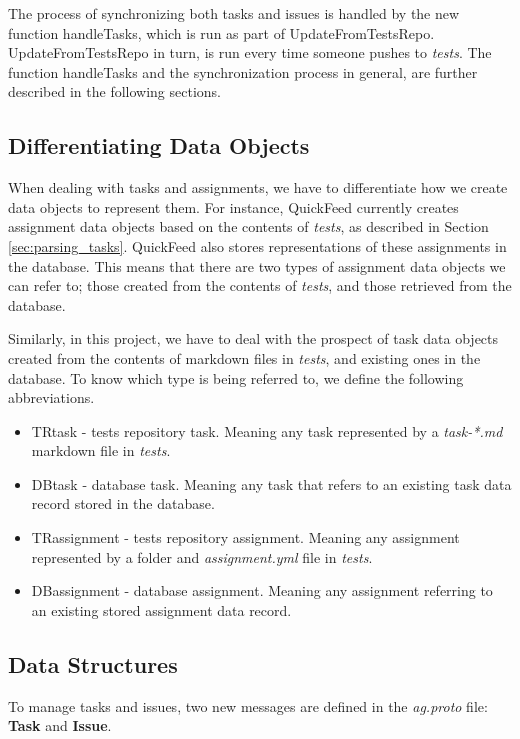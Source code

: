 The process of synchronizing both tasks and issues is handled by the new function handleTasks, which is run as part of UpdateFromTestsRepo.
UpdateFromTestsRepo in turn, is run every time someone pushes to \textit{tests}.
The function handleTasks and the synchronization process in general, are further described in the following sections. 

\subsection{Differentiating Data Objects}

When dealing with tasks and assignments, we have to differentiate how we create data objects to represent them.
For instance, QuickFeed currently creates assignment data objects based on the contents of \textit{tests}, as described in Section \ref{sec:parsing_tasks}.
QuickFeed also stores representations of these assignments in the database.
This means that there are two types of assignment data objects we can refer to; those created from the contents of \textit{tests}, and those retrieved from the database.

Similarly, in this project, we have to deal with the prospect of task data objects created from the contents of markdown files in \textit{tests}, and existing ones in the database.
To know which type is being referred to, we define the following abbreviations.
\begin{itemize}
    \item TRtask - tests repository task. Meaning any task represented by a \textit{task-*.md} markdown file in \textit{tests}.
    \item DBtask - database task. Meaning any task that refers to an existing task data record stored in the database.
    \item TRassignment - tests repository assignment. Meaning any assignment represented by a folder and \textit{assignment.yml} file
    in \textit{tests}. 
    \item DBassignment - database assignment. Meaning any assignment referring to an existing stored assignment data record.
\end{itemize}

\subsection{Data Structures}
\label{sec:tasks-and-issues-data-structures}

To manage tasks and issues, two new messages are defined in the \textit{ag.proto} file: \textbf{Task} and \textbf{Issue}.

